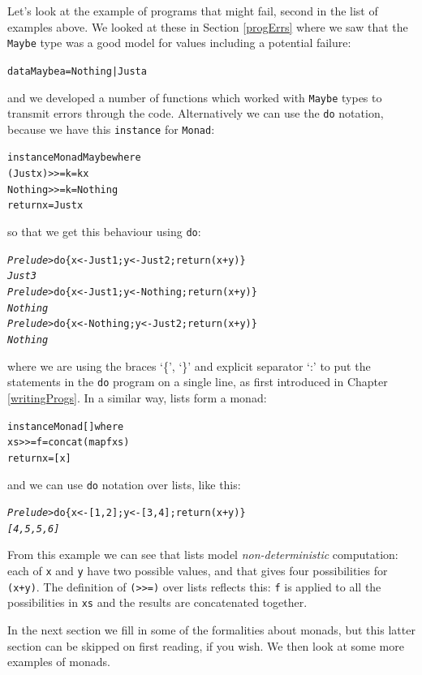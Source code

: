 Let's look at the example of programs that might fail, second in the list of examples above. We looked at these in Section \ref{progErrs} where we saw that the \texttt{Maybe} type was a good model for values including a potential failure:
\begin{alltt}
data Maybe a = Nothing | Just a
\end{alltt}
and we developed a number of functions which worked with \texttt{Maybe} types to transmit errors through the code. Alternatively we can use the \texttt{do} notation, because we have this \texttt{instance} for \texttt{Monad}:
\begin{alltt}
instance Monad Maybe where
  (Just x) >>= k  =  k x
  Nothing  >>= k  =  Nothing
  return x        =  Just x
\end{alltt}
so that we get this behaviour using \texttt{do}:
\begin{alltt}
\textsl{Prelude>} do \{ x <- Just 1; y <- Just 2; return (x+y) \}
\textsl{Just 3}
\textsl{Prelude>} do \{ x <- Just 1; y <- Nothing; return (x+y) \}
\textsl{Nothing}
\textsl{Prelude>} do \{ x <- Nothing; y <- Just 2; return (x+y) \}
\textsl{Nothing}
\end{alltt}
where we are using the braces `\{', `\}' and explicit separator `:' to put the statements in the \texttt{do} program on a single line, as first introduced in Chapter \ref{writingProgs}. In a similar way, lists form a monad:
\begin{alltt}
instance Monad [] where
  xs >>= f  = concat (map f xs)
  return x  = [x]
\end{alltt} 
and we can use \texttt{do} notation over lists, like this:
\begin{alltt}
\textsl{Prelude>} do \{ x <- [1,2]; y <- [3,4]; return (x+y) \}
\textsl{[4,5,5,6]}
\end{alltt}
From this example we can see that lists model \emph{non-deterministic} computation: each of \texttt{x} and \texttt{y} have two possible values, and that gives four possibilities for \texttt{(x+y)}. The definition of \texttt{(>>=)} over lists reflects this: \texttt{f} is applied to all the possibilities in \texttt{xs} and the results are concatenated together.

In the next section we fill in some of the formalities about monads, but this latter section can be skipped on first reading, if you wish. We then look at some more examples of monads.


